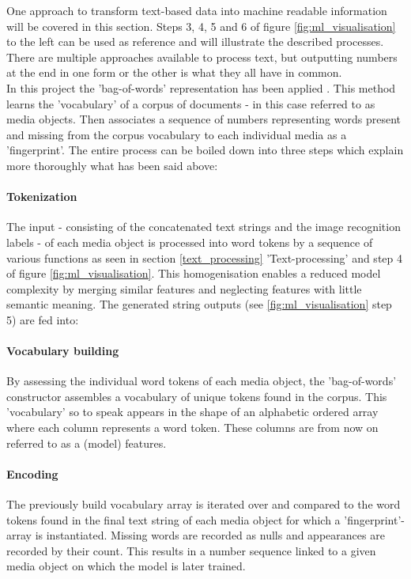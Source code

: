 One approach to transform text-based data into machine readable information will be covered in this section. Steps 3, 4, 5 and 6 of figure \ref{fig:ml_visualisation} to the left can be used as reference and will illustrate the described processes.\\
There are multiple approaches available to process text, but outputting numbers at the end in one form or the other is what they all have in common.\\
In this project the 'bag-of-words' representation has been applied \parencite{Joulin2016}. This method learns the 'vocabulary' of a corpus of documents - in this case referred to as media objects. Then associates a sequence of numbers representing words present and missing from the corpus vocabulary to each individual media as a 'fingerprint'. The entire process can be boiled down into three steps which explain more thoroughly what has been said above:

\paragraph*{Tokenization} The input - consisting of the concatenated text strings and the image recognition labels - of each media object is processed into word tokens by a sequence of various functions as seen in section \ref{text_processing} 'Text-processing' and step 4 of figure \ref{fig:ml_visualisation}. This homogenisation enables a reduced model complexity by merging similar features and neglecting features with little semantic meaning. The generated string outputs (see \ref{fig:ml_visualisation} step 5) are fed into:

\paragraph*{Vocabulary building} By assessing the individual word tokens of each media object, the 'bag-of-words' constructor assembles a vocabulary of unique tokens found in the corpus. This 'vocabulary' so to speak appears in the shape of an alphabetic ordered array where each column represents a word token. These columns are from now on referred to as a (model) features.

\paragraph*{Encoding} The previously build vocabulary array is iterated over and compared to the word tokens found in the final text string of each media object for which a 'fingerprint'-array is instantiated. Missing words are recorded as nulls and appearances are recorded by their count. This results in a number sequence linked to a given media object on which the model is later trained.

